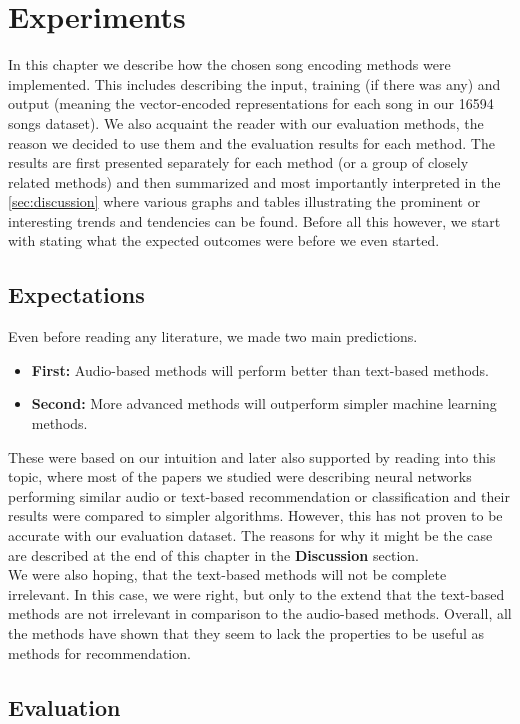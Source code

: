 \chapter{Experiments}

In this chapter we describe how the chosen song encoding methods were implemented. This includes describing the input, training (if there was any) and output (meaning the vector-encoded representations for each song in our 16594 songs dataset). We also acquaint the reader with our evaluation methods, the reason we decided to use them and the evaluation results for each method. The results are first presented separately for each method (or a group of closely related methods) and then summarized and most importantly interpreted in the \ref{sec:discussion} where various graphs and tables illustrating the prominent or interesting trends and tendencies can be found. Before all this however, we start with stating what the expected outcomes were before we even started.

\section{Expectations}

Even before reading any literature, we made two main predictions. 
\begin{itemize}
    \item \textbf{First:} Audio-based methods will perform better than text-based methods.
    \item \textbf{Second:} More advanced methods will outperform simpler machine learning methods.
\end{itemize}
These were based on our intuition and later also supported by reading into this topic, where most of the papers we studied were describing neural networks performing similar audio or text-based recommendation or classification and their results were compared to simpler algorithms. However, this has not proven to be accurate with our evaluation dataset. The reasons for why it might be the case are described at the end of this chapter in the \textbf{Discussion} section. \\
We were also hoping, that the text-based methods will not be complete irrelevant. In this case, we were right, but only to the extend that the text-based methods are not irrelevant in comparison to the audio-based methods. Overall, all the methods have shown that they seem to lack the properties to be useful as methods for recommendation.
\section{Evaluation}

